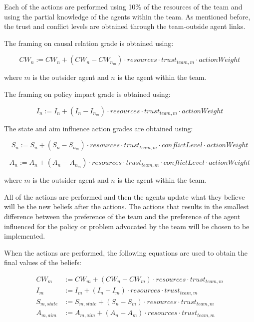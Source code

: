 Each of the actions are performed using 10\% of the resources of the team and using the partial knowledge of the agents within the team. As mentioned before, the trust and conflict levels are obtained through the team-outside agent links.

The framing on causal relation grade is obtained using:

\begin{equation}
CW_n :=  CW_n + \left(CW_{n} - CW_{n_m} \right) \cdot resources \cdot trust_{team,m}  \cdot actionWeight
\end{equation}

where $m$ is the outsider agent and $n$ is the agent within the team.

The framing on policy impact grade is obtained using:

\begin{equation}
I_n :=  I_n + \left(I_{n} - I_{n_m} \right) \cdot resources \cdot trust_{team,m}  \cdot actionWeight
\end{equation}

The state and aim influence action grades are obtained using:

\begin{equation}
S_n :=  S_n +  \left(S_{n} - S_{n_m} \right) \cdot resources \cdot trust_{team,m}  \cdot conflictLevel  \cdot actionWeight
\end{equation}

\begin{equation}
A_n :=  A_n + \left(A_{n} - A_{n_m} \right) \cdot resources \cdot trust_{team,m}  \cdot conflictLevel  \cdot actionWeight
\end{equation}

where $m$ is the outsider agent and $n$ is the agent within the team.

All of the actions are performed and then the agents update what they believe will be the new beliefs after the actions. The actions that results in the smallest difference between the preference of the team and the preference of the agent influenced for the policy or problem advocated by the team will be chosen to be implemented.

When the actions are performed, the following equations are used to obtain the final values of the beliefs:

\begin{equation} \begin{split}
CW_m &:=  CW_m + \left(CW_{n} - CW_{m} \right) \cdot resources \cdot trust_{team,m} \\
I_m &:=  I_m + \left(I_{n} - I_{m} \right) \cdot resources \cdot trust_{team,m} \\
S_{m,state} &:=  S_{m,state} + \left(S_{n} - S_{m} \right) \cdot resources \cdot trust_{team,m} \\
A_{m,aim} &:= A_{m,aim} + \left(A_{n} - A_{m} \right) \cdot resources \cdot trust_{team,m} 
\end{split}\end{equation}


